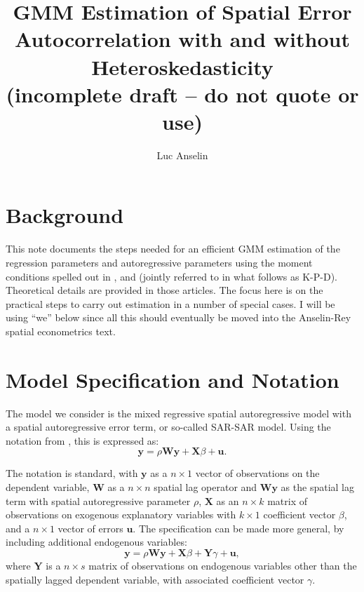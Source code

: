 \documentclass{article}
\title{GMM Estimation of Spatial Error Autocorrelation with and
without Heteroskedasticity\\
(incomplete draft -- do not quote or use)}
\author{Luc Anselin}
\begin{document}
\maketitle
\section{Background}
This note documents the steps needed for an efficient GMM estimation of the
regression parameters and autoregressive parameters using the moment conditions
spelled out in \cite{KelejianPrucha:10}, \cite{Arraizetal:10} and \cite{Drukkeretal:10,Drukkeretal:11} (jointly referred to in what
follows as K-P-D). Theoretical details are
provided in those articles. The focus here is on the practical steps to carry out estimation
in a number of special cases. I will be using ``we'' below since all this should eventually
be moved into the Anselin-Rey spatial econometrics text.

\section{Model Specification and Notation}

The model we consider is the mixed regressive spatial autoregressive model with
a spatial autoregressive error term, or so-called SAR-SAR model. Using the notation from \cite{Anselin:88}, this
is expressed as:
\begin{equation*}
    \mathbf{y} = \rho \mathbf{Wy} + \mathbf{X} \beta + \mathbf{u}.
    \label{model1}
\end{equation*}

The notation is standard, with $\mathbf{y}$ as a $n \times 1$ vector of observations
on the dependent variable, $\mathbf{W}$ as a $n \times n$ spatial lag operator and
$\mathbf{Wy}$ as the spatial lag term with spatial autoregressive parameter
$\rho$, $\mathbf{X}$ as an $n \times k$ matrix of observations
on exogenous explanatory variables with $k \times 1$ coefficient vector $\beta$, and a
$n \times 1$ vector of errors $\mathbf{u}$. The specification can be made more general, by
including additional endogenous variables:
\begin{equation*}
    \mathbf{y} = \rho \mathbf{Wy} + \mathbf{X} \beta + \mathbf{Y} \gamma + \mathbf{u},
\end{equation*}
where 
$\mathbf{Y}$ is a $n \times s$ matrix of observations on endogenous variables
other than the spatially lagged dependent variable, with associated coefficient
vector $\gamma$.
\end{document}
